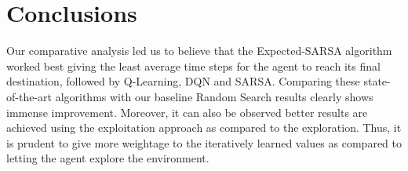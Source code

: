 \documentclass{svproc}
\begin{document}



\newpage
\section{Conclusions}
\label{sec:5}
Our comparative analysis led us to believe that the Expected-SARSA algorithm worked best giving the least average time steps for the agent to reach its final destination, followed by Q-Learning, DQN and SARSA. Comparing these state-of-the-art algorithms with our baseline Random Search results clearly shows immense improvement. Moreover, it can also be observed better results are achieved using the exploitation approach as compared to the exploration. Thus, it is prudent to give more weightage to the iteratively learned values as compared to letting the agent explore the environment.







\end{document}
